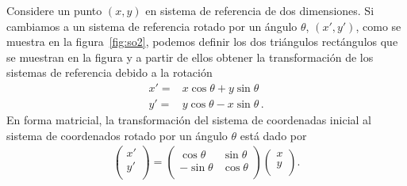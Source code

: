 Considere un punto $(x,y)$ en sistema de referencia de dos dimensiones. Si cambiamos a un sistema de referencia rotado por un ángulo $\theta$, $(x',y')$, como se muestra en la figura~\ref{fig:so2}, podemos definir los dos triángulos rectángulos que se muestran en la figura y a partir de ellos obtener la transformación de los sistemas de referencia debido a la rotación
\begin{align}
  x'=&x\cos\theta+y\sin\theta \nonumber\\
  y'=&y\cos\theta-x\sin\theta\,.
\end{align}
En forma matricial, la transformación del sistema de coordenadas inicial al sistema de coordenados rotado por un ángulo $\theta$ está dado por
\begin{align}
  \begin{pmatrix}
    x'\\
    y'\\
  \end{pmatrix}=
  \begin{pmatrix}
    \cos\theta & \sin\theta\\
    -\sin\theta& \cos\theta\\
  \end{pmatrix}
  \begin{pmatrix}
    x\\
    y\\
  \end{pmatrix}.
\end{align}

